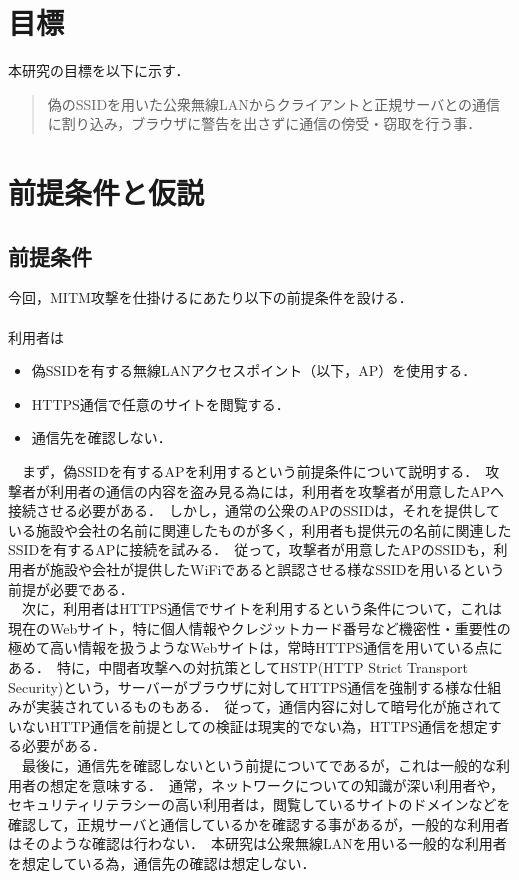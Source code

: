 \documentclass[dvipdfmx]{jsarticle}
\begin{document}
    \section{目標}
        本研究の目標を以下に示す．
        \begin{quote}
            偽のSSIDを用いた公衆無線LANからクライアントと正規サーバとの通信に割り込み，ブラウザに警告を出さずに通信の傍受・窃取を行う事．\
        \end{quote}
    \section{前提条件と仮説}
        \subsection{前提条件}
            今回，MITM攻撃を仕掛けるにあたり以下の前提条件を設ける．\\
            \\
            利用者は
            \begin{itemize}
                \item 偽SSIDを有する無線LANアクセスポイント（以下，AP）を使用する．
                \item HTTPS通信で任意のサイトを閲覧する．
                \item 通信先を確認しない．
            \end{itemize}
            　まず，偽SSIDを有するAPを利用するという前提条件について説明する．\
            攻撃者が利用者の通信の内容を盗み見る為には，利用者を攻撃者が用意したAPへ接続させる必要がある．\
            しかし，通常の公衆のAPのSSIDは，それを提供している施設や会社の名前に関連したものが多く，利用者も提供元の名前に関連したSSIDを有するAPに接続を試みる．\
            従って，攻撃者が用意したAPのSSIDも，利用者が施設や会社が提供したWiFiであると誤認させる様なSSIDを用いるという前提が必要である．\\
            　次に，利用者はHTTPS通信でサイトを利用するという条件について，これは現在のWebサイト，特に個人情報やクレジットカード番号など機密性・重要性の極めて高い情報を扱うようなWebサイトは，常時HTTPS通信を用いている点にある．\
            特に，中間者攻撃への対抗策としてHSTP(HTTP Strict Transport Security)という，サーバーがブラウザに対してHTTPS通信を強制する様な仕組みが実装されているものもある．\
            従って，通信内容に対して暗号化が施されていないHTTP通信を前提としての検証は現実的でない為，HTTPS通信を想定する必要がある．\\
            　最後に，通信先を確認しないという前提についてであるが，これは一般的な利用者の想定を意味する．\
            通常，ネットワークについての知識が深い利用者や，セキュリティリテラシーの高い利用者は，閲覧しているサイトのドメインなどを確認して，正規サーバと通信しているかを確認する事があるが，一般的な利用者はそのような確認は行わない．\
            本研究は公衆無線LANを用いる一般的な利用者を想定している為，通信先の確認は想定しない．\\
\end{document}
